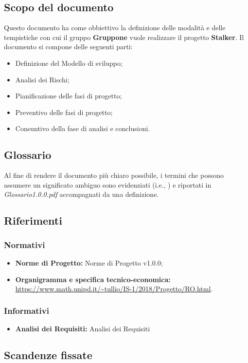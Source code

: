 \documentclass[../piano-di-progetto.tex]{subfiles}
\begin{document}
\subsection{Scopo del documento}%
\label{sub:scopo_del_documento}
Questo documento ha come obbiettivo la definizione delle modalità e delle tempistiche con cui il gruppo \textbf{Gruppone} vuole realizzare il progetto \textbf{Stalker}.
Il documento si compone delle seguenti parti:
\begin{itemize}
  \item Definizione del Modello di sviluppo;
  \item Analisi dei Rischi;
  \item Pianificazione delle fasi di progetto;
  \item Preventivo delle fasi di progetto;
  \item Consuntivo della fase di analisi e conclusioni.
\end{itemize}
\subsection{Glossario}%
\label{sub:glossario}
Al fine di rendere il documento più chiaro possibile, i termini che possono assumere un significato ambiguo sono evidenziati (i.e., ) e riportati in \textit{Glossario1.0.0.pdf} accompagnati da una definizione.
\subsection{Riferimenti}%
\label{sub:riferimenti}
\subsubsection{Normativi}%
\label{subs:normativi}
\begin{itemize}
  \item  \textbf{Norme di Progetto:} Norme di Progetto v1.0.0;
  \item  \textbf{Organigramma e specifica tecnico-economica:} \url{https://www.math.unipd.it/~tullio/IS-1/2018/Progetto/RO.html}.
\end{itemize}
\subsubsection{Informativi}
\begin{itemize}
  \item \textbf{Analisi dei Requisiti:} Analisi dei Requisiti
\end{itemize}%
\label{subs:informativi}
\subsection{Scandenze fissate}%
\label{subs:scadenze_fissate}
\end{document}
